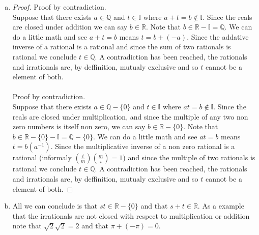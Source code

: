 \documentclass[12pt]{article}
\theoremstyle{homework}
\newcommand{\Rats}{\ensuremath{\mathbb Q}}
\begin{document}
\begin{enumerate}[(a)]
\item \begin{proof}
Proof by contradiction.\\
Suppose that there exists $a\in\Rats$ and $t\in\mathbb{I}$ where $a+t=b\notin\mathbb{I}$.  Since the reals are closed under addition we can say $b\in\mathbb{R}$.  Note that $b\in\mathbb{R} -\mathbb{I}=\mathbb{Q}$.  We can do a little math and see $a+t=b$ means $t=b+(-a)$.  Since the addative inverse of a rational is a rational and since the sum of two rationals is rational we conclude $t\in \mathbb{Q}$.  A contradiction has been reached, the rationals and irrationals are, by deffinition, mutualy exclusive and so $t$ cannot be a element of both.\\\\
Proof by contradiction.\\
Suppose that there exists $a\in\Rats-\{0\}$ and $t\in\mathbb{I}$ where $at=b\notin\mathbb{I}$.  Since the reals are closed under multiplication, and since the multiple of any two non zero numbers is itself non zero, we can say $b\in\mathbb{R}-\{0\}$.  Note that $b\in\mathbb{R}-\{0\} -\mathbb{I}=\mathbb{Q}-\{0\}$.  We can do a little math and see $at=b$ means $t=b(a^{-1})$.  Since the multiplicative inverse of a non zero rational is a rational (informaly $(\frac{i}{m})(\frac{m}{i})=1$) and since the multiple of two rationals is rational we conclude $t\in \mathbb{Q}$.  A contradiction has been reached, the rationals and irrationals are, by deffinition, mutualy exclusive and so $t$ cannot be a element of both.
\end{proof}

\item 
All we can conclude is that $st\in \mathbb{R}-\{0\}$ and that $s+t\in \mathbb{R}$.  As a example that the irrationals are not closed with respect to multiplication or addition note that $\sqrt{2}\sqrt{2}=2$ and that $\pi+(-\pi)=0$.
\end{enumerate}
\end{document}
